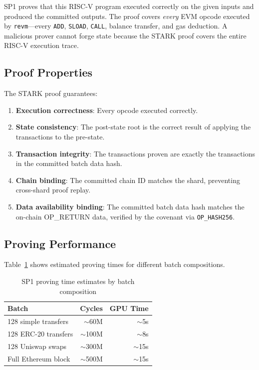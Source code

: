 \documentclass[11pt,twocolumn]{article}
\begin{document}
SP1 proves that this RISC-V program executed correctly on the given inputs and produced the committed outputs. The proof covers \emph{every} EVM opcode executed by \texttt{revm}---every \texttt{ADD}, \texttt{SLOAD}, \texttt{CALL}, balance transfer, and gas deduction. A malicious prover cannot forge state because the STARK proof covers the entire RISC-V execution trace.

\subsection{Proof Properties}

The STARK proof guarantees:

\begin{enumerate}[nosep,leftmargin=1.5em]
\item \textbf{Execution correctness}: Every opcode executed correctly.
\item \textbf{State consistency}: The post-state root is the correct result of applying the transactions to the pre-state.
\item \textbf{Transaction integrity}: The transactions proven are exactly the transactions in the committed batch data hash.
\item \textbf{Chain binding}: The committed chain ID matches the shard, preventing cross-shard proof replay.
\item \textbf{Data availability binding}: The committed batch data hash matches the on-chain OP\_RETURN data, verified by the covenant via \texttt{OP\_HASH256}.
\end{enumerate}

\subsection{Proving Performance}

Table~\ref{tab:proving} shows estimated proving times for different batch compositions.

\begin{table}[h]
\centering
\caption{SP1 proving time estimates by batch composition}
\label{tab:proving}
\begin{tabular}{@{}lrr@{}}
\toprule
\textbf{Batch} & \textbf{Cycles} & \textbf{GPU Time} \\
\midrule
128 simple transfers & $\sim$60M & $\sim$5s \\
128 ERC-20 transfers & $\sim$100M & $\sim$8s \\
128 Uniswap swaps & $\sim$300M & $\sim$15s \\
Full Ethereum block & $\sim$500M & $\sim$15s \\
\bottomrule
\end{tabular}
\end{table}
\end{document}
